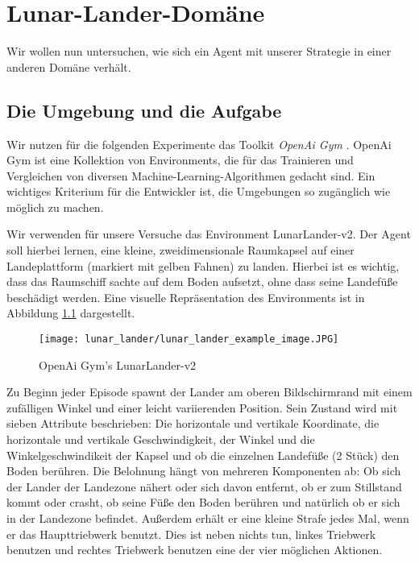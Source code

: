 \chapter{Lunar-Lander-Domäne}\label{sec:LunaLander}
Wir wollen nun untersuchen, wie sich ein Agent mit unserer Strategie in einer anderen Domäne verhält.

\section{Die Umgebung und die Aufgabe}
Wir nutzen für die folgenden Experimente das Toolkit \textit{OpenAi Gym} \cite{x03_openaiGym}. OpenAi Gym ist eine Kollektion von Environments, die für das Trainieren und Vergleichen von diversen Machine-Learning-Algorithmen gedacht sind. Ein wichtiges Kriterium für die Entwickler ist, die Umgebungen so zugänglich wie möglich zu machen.

Wir verwenden für unsere Versuche das Environment \glqq LunarLander-v2\grqq{}. Der Agent soll hierbei lernen, eine kleine, zweidimensionale Raumkapsel auf einer Landeplattform (markiert mit gelben Fahnen) zu landen. Hierbei ist es wichtig, dass das Raumschiff sachte auf dem Boden aufsetzt, ohne dass seine Landefüße beschädigt werden. Eine visuelle Repräsentation des Environments ist in Abbildung \ref{img:lunarLanderExample} dargestellt.

\begin{figure}[h!]
    \centering
    \texttt{[image: lunar\_lander/lunar\_lander\_example\_image.JPG]}
    \caption{OpenAi Gym's \glqq LunarLander-v2\grqq{}} \label{img:lunarLanderExample}
\end{figure}

Zu Beginn jeder Episode spawnt der Lander am oberen Bildschirmrand mit einem zufälligen Winkel und einer leicht variierenden Position. Sein Zustand wird mit sieben Attribute beschrieben: Die horizontale und vertikale Koordinate, die horizontale und vertikale Geschwindigkeit, der Winkel und die Winkelgeschwindikeit der Kapsel und ob die einzelnen Landefüße (2 Stück) den Boden berühren. Die Belohnung hängt von mehreren Komponenten ab: Ob sich der Lander der Landezone nähert oder sich davon entfernt, ob er zum Stillstand kommt oder crasht, ob seine Füße den Boden berühren und natürlich ob er sich in der Landezone befindet. Außerdem erhält er eine kleine Strafe jedes Mal, wenn er das Haupttriebwerk benutzt. Dies ist neben nichts tun, linkes Triebwerk benutzen und rechtes Triebwerk benutzen eine der vier möglichen Aktionen.

